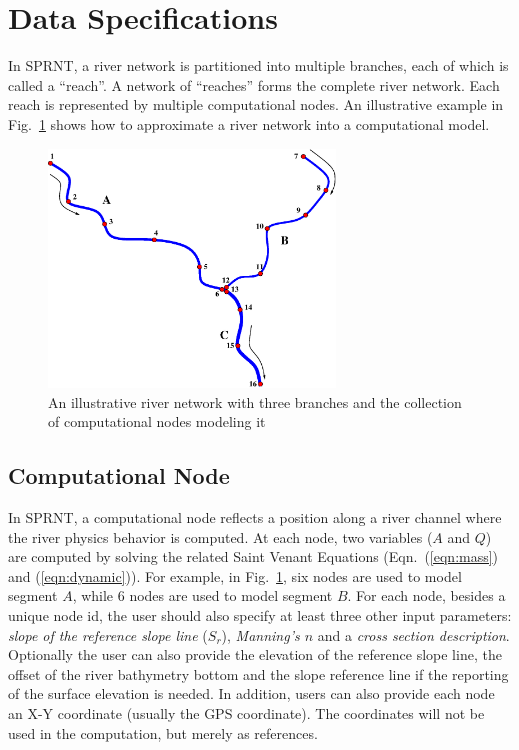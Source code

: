 \documentclass[10pt, letterpaper]{article}
\def\epswidth{3.0in}
\begin{document}
\section{Data Specifications}
\label{sec:modeling}
In SPRNT, a river network is partitioned into multiple branches, each of which is called a
``reach''. A network of ``reaches'' forms the complete river network.  Each reach is
represented by multiple computational nodes. An illustrative example in
Fig.~\ref{fig:rivers} shows how to approximate a river network into a computational model.
\begin{figure}[hbt]
\centerline{
\includegraphics[width=\epswidth, keepaspectratio=true]{Figs/rbd.eps}  }
\caption{An illustrative river network with three branches and the collection of
  computational nodes modeling it}
\label{fig:rivers}
\end{figure}

\subsection{Computational Node}
\label{subsec:node_concept}
In SPRNT, a computational node reflects a position along a river channel where the river
physics behavior is computed. At each node, two variables ($A$ and $Q$) are computed by
solving the related Saint Venant Equations (Eqn.~(\ref{eqn:mass}) and
(\ref{eqn:dynamic})). For example, in Fig.~\ref{fig:rivers}, six nodes are used to model
segment $A$, while 6 nodes are used to model segment $B$.  For each node, besides a unique
node id, the user should also specify at least three other input parameters: {\em slope of
  the reference slope line} ($S_r$), {\em Manning's $n$} and a {\em cross section
  description}. Optionally the user can also provide the elevation of the reference slope
line, the offset of the river bathymetry bottom and the slope reference line if the
reporting of the surface elevation is needed. In addition, users can also provide each
node an X-Y coordinate (usually the GPS coordinate). The coordinates will not be used in
the computation, but merely as references.
\end{document}
